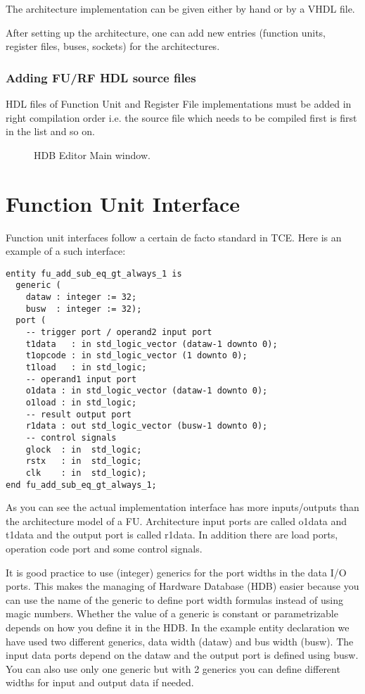 \documentclass[twoside]{tceusermanual}
\begin{document}
The architecture implementation can be given either by hand or by a VHDL file.

After setting up the architecture, one can add new entries (function units,
register files, buses, sockets) for the architectures.

\subsubsection{Adding FU/RF HDL source files}
HDL files of Function Unit and Register File implementations must be added in
right compilation order i.e. the source file which needs to be compiled first
is first in the list and so on.

\begin{figure}[tb]
\centerline{}
\caption{HDB Editor Main window.}
\label{fig:hdbeditor_main_window}
\end{figure}


\section{Function Unit Interface}

Function unit interfaces follow a certain de facto standard in TCE. Here is
an example of a such interface:

\begin{verbatim}
entity fu_add_sub_eq_gt_always_1 is
  generic (
    dataw : integer := 32;
    busw  : integer := 32);
  port (
    -- trigger port / operand2 input port
    t1data   : in std_logic_vector (dataw-1 downto 0);
    t1opcode : in std_logic_vector (1 downto 0);
    t1load   : in std_logic;
    -- operand1 input port
    o1data : in std_logic_vector (dataw-1 downto 0);
    o1load : in std_logic;
    -- result output port
    r1data : out std_logic_vector (busw-1 downto 0);
    -- control signals
    glock  : in  std_logic;
    rstx   : in  std_logic;
    clk    : in  std_logic);
end fu_add_sub_eq_gt_always_1;
\end{verbatim}

As you can see the actual implementation interface has more inputs/outputs
than the architecture model of a FU. Architecture input ports are
called o1data and t1data and the output port is called r1data. In addition
there are load ports, operation code port and some control signals.

It is good practice to use (integer) generics for the port widths in the data
I/O ports. This makes the managing of Hardware Database (HDB) easier because
you can use the name of the generic to define port width formulas instead of
using magic numbers. Whether the value of a generic is constant or
parametrizable depends on how you define it in the HDB. In the example
entity declaration we have used two different generics, data width (dataw)
and bus width (busw). The input data ports depend on the dataw and the
output port is defined using busw. You can also use only one generic but
with 2 generics you can define different widths for input and output data if
needed.
\end{document}
